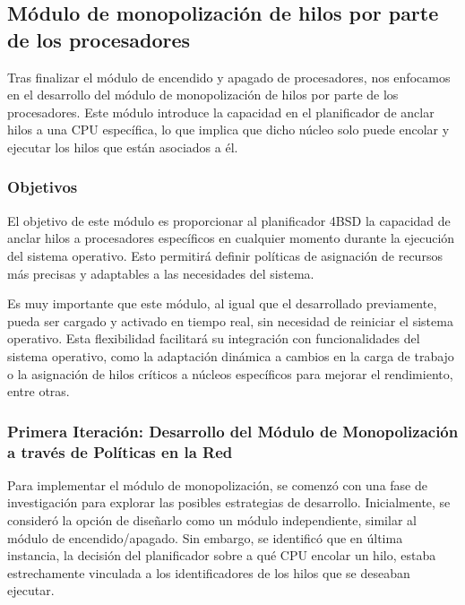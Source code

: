 \subsection{Módulo de monopolización de hilos por parte de los procesadores}

Tras finalizar el módulo de encendido y apagado de procesadores, nos enfocamos en el desarrollo del módulo de monopolización de hilos por parte de los procesadores. Este módulo introduce la capacidad en el planificador de anclar hilos a una CPU específica, lo que implica que dicho núcleo solo puede encolar y ejecutar los hilos que están asociados a él.\par

\subsubsection{Objetivos}

El objetivo de este módulo es proporcionar al planificador 4BSD la capacidad de anclar hilos a procesadores específicos en cualquier momento durante la ejecución del sistema operativo. Esto permitirá definir políticas de asignación de recursos más precisas y adaptables a las necesidades del sistema.\par

Es muy importante que este módulo, al igual que el desarrollado previamente, pueda ser cargado y activado en tiempo real, sin necesidad de reiniciar el sistema operativo. Esta flexibilidad facilitará su integración con funcionalidades del sistema operativo, como la adaptación dinámica a cambios en la carga de trabajo o la asignación de hilos críticos a núcleos específicos para mejorar el rendimiento, entre otras.\par

\subsubsection{Primera Iteración: Desarrollo del Módulo de Monopolización a través de Políticas en la Red}

Para implementar el módulo de monopolización, se comenzó con una fase de investigación para explorar las posibles estrategias de desarrollo. Inicialmente, se consideró la opción de diseñarlo como un módulo independiente, similar al módulo de encendido/apagado. Sin embargo, se identificó que en última instancia, la decisión del planificador sobre a qué CPU encolar un hilo, estaba estrechamente vinculada a los identificadores de los hilos que se deseaban ejecutar.

